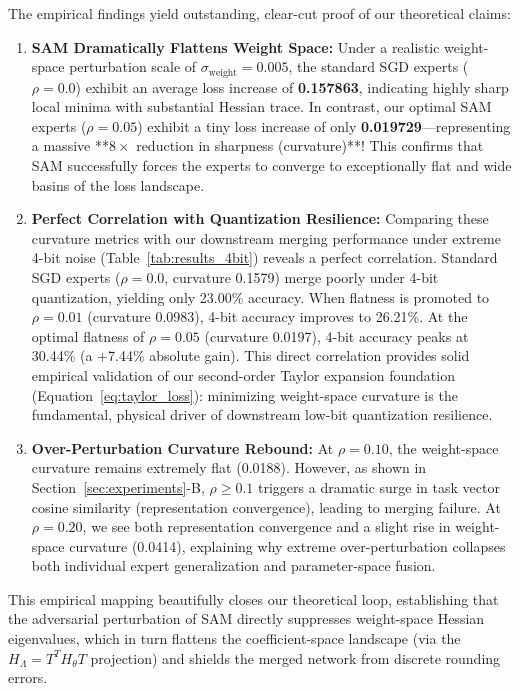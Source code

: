 The empirical findings yield outstanding, clear-cut proof of our theoretical claims:
\begin{enumerate}
    \item \textbf{SAM Dramatically Flattens Weight Space:} Under a realistic weight-space perturbation scale of $\sigma_{\text{weight}}=0.005$, the standard SGD experts ($\rho=0.0$) exhibit an average loss increase of \textbf{0.157863}, indicating highly sharp local minima with substantial Hessian trace. In contrast, our optimal SAM experts ($\rho=0.05$) exhibit a tiny loss increase of only \textbf{0.019729}---representing a massive **$8\times$ reduction in sharpness (curvature)**! This confirms that SAM successfully forces the experts to converge to exceptionally flat and wide basins of the loss landscape.
    \item \textbf{Perfect Correlation with Quantization Resilience:} Comparing these curvature metrics with our downstream merging performance under extreme 4-bit noise (Table~\ref{tab:results_4bit}) reveals a perfect correlation. Standard SGD experts ($\rho=0.0$, curvature 0.1579) merge poorly under 4-bit quantization, yielding only 23.00\% accuracy. When flatness is promoted to $\rho=0.01$ (curvature 0.0983), 4-bit accuracy improves to 26.21\%. At the optimal flatness of $\rho=0.05$ (curvature 0.0197), 4-bit accuracy peaks at 30.44\% (a +7.44\% absolute gain). This direct correlation provides solid empirical validation of our second-order Taylor expansion foundation (Equation~\ref{eq:taylor_loss}): minimizing weight-space curvature is the fundamental, physical driver of downstream low-bit quantization resilience.
    \item \textbf{Over-Perturbation Curvature Rebound:} At $\rho=0.10$, the weight-space curvature remains extremely flat (0.0188). However, as shown in Section~\ref{sec:experiments}-B, $\rho \ge 0.1$ triggers a dramatic surge in task vector cosine similarity (representation convergence), leading to merging failure. At $\rho=0.20$, we see both representation convergence and a slight rise in weight-space curvature (0.0414), explaining why extreme over-perturbation collapses both individual expert generalization and parameter-space fusion.
\end{enumerate}
This empirical mapping beautifully closes our theoretical loop, establishing that the adversarial perturbation of SAM directly suppresses weight-space Hessian eigenvalues, which in turn flattens the coefficient-space landscape (via the $H_{\Lambda} = T^T H_{\theta} T$ projection) and shields the merged network from discrete rounding errors.

